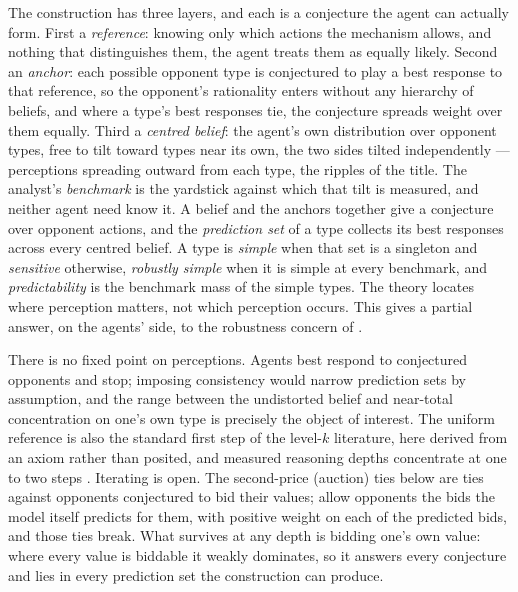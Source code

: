 \documentclass[12pt]{article}
\theoremstyle{definition}
\begin{document}
The construction has three layers, and each is a conjecture the agent can actually form. First a \emph{reference}: knowing only which actions the mechanism allows, and nothing that distinguishes them, the agent treats them as equally likely. Second an \emph{anchor}: each possible opponent type is conjectured to play a best response to that reference, so the opponent's rationality enters without any hierarchy of beliefs, and where a type's best responses tie, the conjecture spreads weight over them equally. Third a \emph{centred belief}: the agent's own distribution over opponent types, free to tilt toward types near its own, the two sides tilted independently --- perceptions spreading outward from each type, the ripples of the title. The analyst's \emph{benchmark} is the yardstick against which that tilt is measured, and neither agent need know it. A belief and the anchors together give a conjecture over opponent actions, and the \emph{prediction set} of a type collects its best responses across every centred belief. A type is \emph{simple} when that set is a singleton and \emph{sensitive} otherwise, \emph{robustly simple} when it is simple at every benchmark, and \emph{predictability} is the benchmark mass of the simple types. The theory locates where perception matters, not which perception occurs. This gives a partial answer, on the agents' side, to the robustness concern of \citet{wilson1987}.

There is no fixed point on perceptions. Agents best respond to conjectured opponents and stop; imposing consistency would narrow prediction sets by assumption, and the range between the undistorted belief and near-total concentration on one's own type is precisely the object of interest. The uniform reference is also the standard first step of the level-$k$ literature, here derived from an axiom rather than posited, and measured reasoning depths concentrate at one to two steps \citep{nagel1995, arad2012, crawford2007levelk}. Iterating is open. The second-price (auction) ties below are ties against opponents conjectured to bid their values; allow opponents the bids the model itself predicts for them, with positive weight on each of the predicted bids, and those ties break. What survives at any depth is bidding one's own value: where every value is biddable it weakly dominates, so it answers every conjecture and lies in every prediction set the construction can produce.
\end{document}
